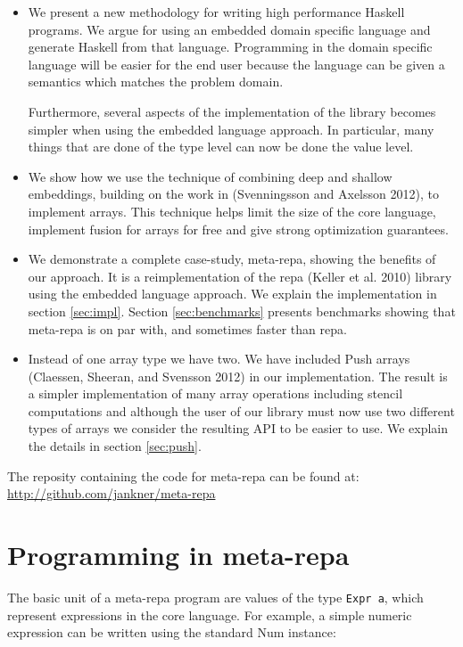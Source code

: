 \documentclass[preprint]{sigplanconf}
\begin{document}
\begin{itemize}
\item
  We present a new methodology for writing high performance Haskell
  programs. We argue for using an embedded domain specific language and
  generate Haskell from that language. Programming in the domain
  specific language will be easier for the end user because the language
  can be given a semantics which matches the problem domain.

  Furthermore, several aspects of the implementation of the library
  becomes simpler when using the embedded language approach. In
  particular, many things that are done of the type level can now be
  done the value level.
\item
  We show how we use the technique of combining deep and shallow
  embeddings, building on the work in (Svenningsson and Axelsson 2012),
  to implement arrays. This technique helps limit the size of the core
  language, implement fusion for arrays for free and give strong
  optimization guarantees.
\item
  We demonstrate a complete case-study, meta-repa, showing the benefits
  of our approach. It is a reimplementation of the repa (Keller et al.
  2010) library using the embedded language approach. We explain the
  implementation in section \ref{sec:impl}. Section \ref{sec:benchmarks}
  presents benchmarks showing that meta-repa is on par with, and
  sometimes faster than repa.
\item
  Instead of one array type we have two. We have included Push arrays
  (Claessen, Sheeran, and Svensson 2012) in our implementation. The
  result is a simpler implementation of many array operations including
  stencil computations and although the user of our library must now use
  two different types of arrays we consider the resulting API to be
  easier to use. We explain the details in section \ref{sec:push}.
\end{itemize}

The reposity containing the code for meta-repa can be found at:
\url{http://github.com/jankner/meta-repa}

\section{Programming in meta-repa}

\label{sec:programming}

The basic unit of a meta-repa program are values of the type
\texttt{Expr a}, which represent expressions in the core language. For
example, a simple numeric expression can be written using the standard
Num instance:
\end{document}
